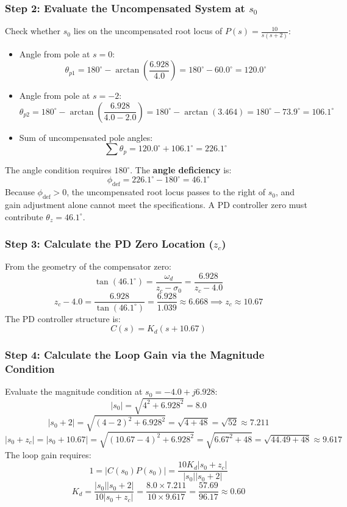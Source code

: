 \documentclass[12pt,onecolumn,twoside ]{article}
\begin{document}
	\subsubsection{Step 2: Evaluate the Uncompensated System at $s_0$}
	Check whether $s_0$ lies on the uncompensated root locus of $P(s) = \frac{10}{s(s + 2)}$:
	\begin{itemize}
		\item
		Angle from pole at $s = 0$: \[
		\theta_{p1} = 180^\circ - \arctan\left(\frac{6.928}{4.0}\right) = 180^\circ - 60.0^\circ = 120.0^\circ
		\]
		\item
		Angle from pole at $s = -2$: \[
		\theta_{p2} = 180^\circ - \arctan\left(\frac{6.928}{4.0 - 2.0}\right) = 180^\circ - \arctan(3.464) = 180^\circ - 73.9^\circ = 106.1^\circ
		\]
		\item
		Sum of uncompensated pole angles: \[
		\sum \theta_p = 120.0^\circ + 106.1^\circ = 226.1^\circ
		\]
	\end{itemize}
	The angle condition requires $180^\circ$. The \textbf{angle deficiency} is: \[
	\phi_{\text{def}} = 226.1^\circ - 180^\circ = 46.1^\circ
	\] Because $\phi_{\text{def}} > 0$, the uncompensated root locus passes to the right of $s_0$, and gain adjustment alone cannot meet the specifications. A PD controller zero must contribute $\theta_z = 46.1^\circ$.
	\subsubsection{Step 3: Calculate the PD Zero Location ($z_c$)}
	From the geometry of the compensator zero: \[
	\tan(46.1^\circ) = \frac{\omega_d}{z_c - \sigma_0} = \frac{6.928}{z_c - 4.0}
	\] \[
	z_c - 4.0 = \frac{6.928}{\tan(46.1^\circ)} = \frac{6.928}{1.039} \approx 6.668 \implies z_c \approx 10.67
	\] The PD controller structure is: \[
	C(s) = K_d(s + 10.67)
	\]
	\subsubsection{Step 4: Calculate the Loop Gain via the Magnitude Condition}
	Evaluate the magnitude condition at $s_0 = -4.0 + j6.928$: \[
	|s_0| = \sqrt{4^2 + 6.928^2} = 8.0
	\] \[
	|s_0 + 2| = \sqrt{(4 - 2)^2 + 6.928^2} = \sqrt{4 + 48} = \sqrt{52} \approx 7.211
	\] \[
	|s_0 + z_c| = |s_0 + 10.67| = \sqrt{(10.67 - 4)^2 + 6.928^2} = \sqrt{6.67^2 + 48} = \sqrt{44.49 + 48} \approx 9.617
	\]
	The loop gain requires: \[
	1 = |C(s_0) P(s_0)| = \frac{10 K_d |s_0 + z_c|}{|s_0| |s_0 + 2|}
	\] \[
	K_d = \frac{|s_0| |s_0 + 2|}{10 |s_0 + z_c|} = \frac{8.0 \times 7.211}{10 \times 9.617} = \frac{57.69}{96.17} \approx 0.60
	\]
\end{document}
